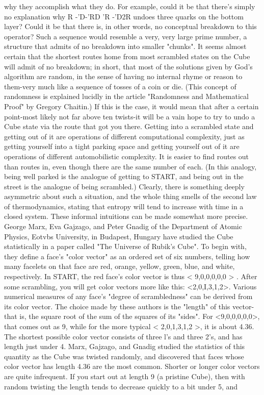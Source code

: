 why they accomplish what they do. For example, could it be that there's simply no
explanation why R -'D-'RD 'R -'D2R undoes three quarks on the bottom layer?
Could it be that there is, in other words, no conceptual breakdown to this operator?
Such a sequence would resemble a very, very large prime number, a structure that
admits of no breakdown into smaller "chunks".
        It seems almost certain that the shortest routes home from most scrambled
states on the Cube will admit of no breakdown; in short, that most of the solutions
given by God's algorithm are random, in the sense of having no internal rhyme or
reason to them-very much like a sequence of tosses of a coin or die. (This concept
of randomness is explained lucidly in the article "Randomness and Mathematical
Proof" by Gregory Chaitin.) If this is the case, it would mean that after a certain
point-most likely not far above ten twists-it will be a vain hope to try to undo a
Cube state via the route that got you there.
        Getting into a scrambled state and getting out of it are operations of
different computational complexity, just as getting yourself into a tight parking
space and getting yourself out of it are operations of different automobilistic
complexity. It is easier to find routes out than routes in, even though there are the
same number of each. (In this analogy, being well parked is the analogue of getting
to START, and being out in the street is the analogue of being scrambled.) Clearly,
there is something deeply asymmetric about such a situation, and the whole thing
smells of the second law of thermodynamics, stating that entropy will tend to
increase with time in a closed system.
        These informal intuitions can be made somewhat more precise. George
Marx, Eva Gajzago, and Peter Gnadig of the Department of Atomic Physics,
Eotvbs University, in Budapest, Hungary have studied the Cube statistically in a
paper called "The Universe of Rubik's Cube". To begin with, they define a face's
"color vector" as an ordered set of six numbers, telling how many facelets on that
face are red, orange, yellow, green, blue, and white, respectively. In START, the
red face's color vector is thus < 9,0,0,0,0,0 > . After some scrambling, you will get
color vectors more like this: <2,0,I,3,1,2>. Various numerical measures of any
face's "degree of scrambledness" can be derived from its color vector. The choice
made by these authors is the "length" of this vector-that is, the square root of the
sum of the squares of its "sides". For <9,0,0,0,0,0>, that comes out as 9, while for
the more typical < 2,0,1,3,1,2 >, it is about 4.36. The shortest possible color vector
consists of three l's and three 2's, and has length just under 4.
        Marx, Gajzago, and Gnadig studied the statistics of this quantity as the
Cube was twisted randomly, and discovered that faces whose color vector has
length 4.36 are the most common. Shorter or longer color vectors are quite
infrequent. If you start out at length 9 (a pristine Cube), then with random twisting
the length tends to decrease quickly to a bit under 5, and




